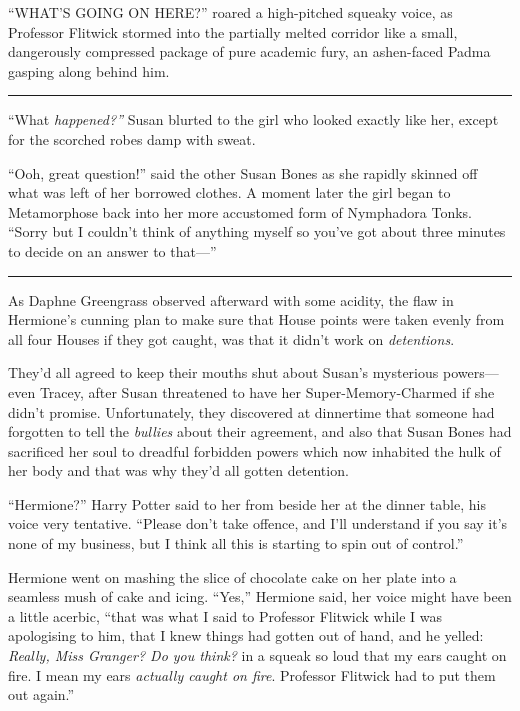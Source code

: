 ``WHAT'S GOING ON HERE?'' roared a high-pitched squeaky voice, as
Professor Flitwick stormed into the partially melted corridor like a
small, dangerously compressed package of pure academic fury, an
ashen-faced Padma gasping along behind him.

\begin{center}\rule{3in}{0.4pt}\end{center}

``What \emph{happened?''} Susan blurted to the girl who looked exactly
like her, except for the scorched robes damp with sweat.

``Ooh, great question!'' said the other Susan Bones as she rapidly
skinned off what was left of her borrowed clothes. A moment later the
girl began to Metamorphose back into her more accustomed form of
Nymphadora Tonks. ``Sorry but I couldn't think of anything myself so
you've got about three minutes to decide on an answer to that---''

\begin{center}\rule{3in}{0.4pt}\end{center}

As Daphne Greengrass observed afterward with some acidity, the flaw in
Hermione's cunning plan to make sure that House points were taken evenly
from all four Houses if they got caught, was that it didn't work on
\emph{detentions}.

They'd all agreed to keep their mouths shut about Susan's mysterious
powers---even Tracey, after Susan threatened to have her
Super-Memory-Charmed if she didn't promise. Unfortunately, they
discovered at dinnertime that someone had forgotten to tell the
\emph{bullies} about their agreement, and also that Susan Bones had
sacrificed her soul to dreadful forbidden powers which now inhabited the
hulk of her body and that was why they'd all gotten detention.

``Hermione?'' Harry Potter said to her from beside her at the dinner
table, his voice very tentative. ``Please don't take offence, and I'll
understand if you say it's none of my business, but I think all this is
starting to spin out of control.''

Hermione went on mashing the slice of chocolate cake on her plate into a
seamless mush of cake and icing. ``Yes,'' Hermione said, her voice might
have been a little acerbic, ``that was what I said to Professor Flitwick
while I was apologising to him, that I knew things had gotten out of
hand, and he yelled: \emph{Really, Miss Granger? Do you think?} in a
squeak so loud that my ears caught on fire. I mean my ears
\emph{actually caught on fire}. Professor Flitwick had to put them out
again.''

